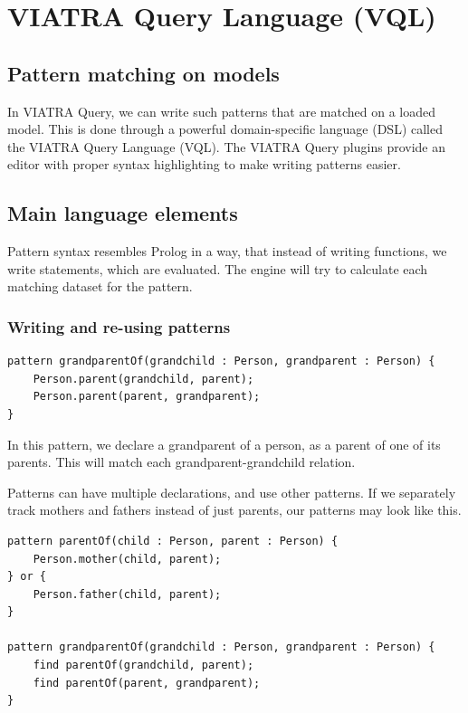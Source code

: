 \documentclass[11pt,a4paper,oneside]{report}
\begin{document}
\section{VIATRA Query Language (VQL)}
\subsection{Pattern matching on models}

In VIATRA Query, we can write such patterns that are matched on a loaded model.
This is done through a powerful domain-specific language (DSL) called the VIATRA
Query Language (VQL). The VIATRA Query plugins provide an editor with proper
syntax highlighting to make writing patterns easier.

\subsection{Main language elements}
Pattern syntax resembles Prolog in a way, that instead of writing functions, we
write statements, which are evaluated. The engine will try to calculate each
matching dataset for the pattern.

\subsubsection{Writing and re-using patterns}
\begin{lstlisting}[frame=single]
pattern grandparentOf(grandchild : Person, grandparent : Person) {
    Person.parent(grandchild, parent);
    Person.parent(parent, grandparent);
}
\end{lstlisting}

In this pattern, we declare a grandparent of a person, as a parent of one of its
parents. This will match each grandparent-grandchild relation.

Patterns can have multiple declarations, and use other patterns.
If we separately track mothers and fathers instead of just parents, our patterns
may look like this.

\begin{lstlisting}[frame=single]
pattern parentOf(child : Person, parent : Person) {
    Person.mother(child, parent);
} or {
    Person.father(child, parent);
}

pattern grandparentOf(grandchild : Person, grandparent : Person) {
    find parentOf(grandchild, parent);
    find parentOf(parent, grandparent);
}
\end{lstlisting}
\end{document}
